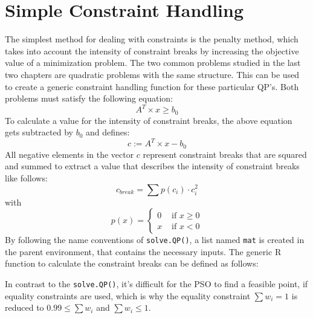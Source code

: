 \documentclass[
  oneside]{book}
\newenvironment{Shaded}{\begin{snugshade}}{\end{snugshade}}
\newcommand{\ControlFlowTok}[1]{\textcolor[rgb]{0.13,0.29,0.53}{\textbf{#1}}}
\newcommand{\DecValTok}[1]{\textcolor[rgb]{0.00,0.00,0.81}{#1}}
\newcommand{\FunctionTok}[1]{\textcolor[rgb]{0.00,0.00,0.00}{#1}}
\newcommand{\NormalTok}[1]{#1}
\newcommand{\OtherTok}[1]{\textcolor[rgb]{0.56,0.35,0.01}{#1}}
\newcommand{\SpecialCharTok}[1]{\textcolor[rgb]{0.00,0.00,0.00}{#1}}
\begin{document}
\hypertarget{simple-constraint-handling}{%
\section{Simple Constraint Handling}\label{simple-constraint-handling}}

The simplest method for dealing with constraints is the penalty method, which takes into account the intensity of constraint breaks by increasing the objective value of a minimization problem. The two common problems studied in the last two chapters are quadratic problems with the same structure. This can be used to create a generic constraint handling function for these particular QP's. Both problems must satisfy the following equation:
\[
  A^T \times x  \geq b_0
\]
To calculate a value for the intensity of constraint breaks, the above equation gets subtracted by \(b_0\) and defines:
\[
  c := A^T \times x - b_0
\]
All negative elements in the vector \(c\) represent constraint breaks that are squared and summed to extract a value that describes the intensity of constraint breaks like follows:
\[
  c_{break} = \sum p(c_i) \cdot c_i^2
\]
with
\[
 p(x) =   \begin{cases}
  0 &\text{ if }x \geq 0\\
  x &\text{ if }x < 0
  \end{cases}
\]
By following the name conventions of \texttt{solve.QP()}, a list named \texttt{mat} is created in the parent environment, that contains the necessary inputs. The generic R function to calculate the constraint breaks can be defined as follows:

\begin{Shaded}
\end{Shaded}

In contrast to the \texttt{solve.QP()}, it's difficult for the PSO to find a feasible point, if equality constraints are used, which is why the equality constraint \(\textstyle\sum w_i = 1\) is reduced to \(0.99 \leq \textstyle\sum w_i\) and \(\textstyle\sum w_i \leq 1\).
\end{document}
